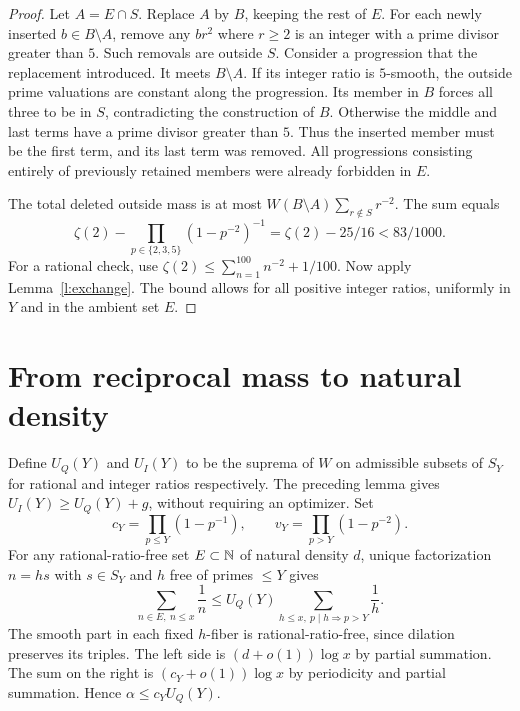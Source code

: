\documentclass[11pt]{article}
\begin{document}
\begin{proof}
Let $A=E\cap S$. Replace $A$ by $B$, keeping the rest of $E$. For each newly inserted $b\in B\setminus A$, remove any $br^2$ where $r\ge2$ is an integer with a prime divisor greater than $5$. Such removals are outside $S$. Consider a progression that the replacement introduced. It meets $B\setminus A$. If its integer ratio is $5$-smooth, the outside prime valuations are constant along the progression. Its member in $B$ forces all three to be in $S$, contradicting the construction of $B$. Otherwise the middle and last terms have a prime divisor greater than $5$. Thus the inserted member must be the first term, and its last term was removed. All progressions consisting entirely of previously retained members were already forbidden in $E$.

The total deleted outside mass is at most $W(B\setminus A)\sum_{r\notin S}r^{-2}$. The sum equals
\[
 \zeta(2)-\prod_{p\in\{2,3,5\}}(1-p^{-2})^{-1}
   =\zeta(2)-25/16 < 83/1000 .
\]
For a rational check, use $\zeta(2)\le\sum_{n=1}^{100}n^{-2}+1/100$. Now apply Lemma~\ref{l:exchange}. The bound allows for all positive integer ratios, uniformly in $Y$ and in the ambient set $E$.
\end{proof}
\section{From reciprocal mass to natural density}
Define $U_Q(Y)$ and $U_I(Y)$ to be the suprema of $W$ on admissible subsets of $S_Y$ for rational and integer ratios respectively. The preceding lemma gives $U_I(Y)\ge U_Q(Y)+g$, without requiring an optimizer. Set
\[
 c_Y=\prod_{p\le Y}(1-p^{-1}),\qquad v_Y=\prod_{p>Y}(1-p^{-2}).
\]
For any rational-ratio-free set $E\subset\mathbb N$ of natural density $d$, unique factorization $n=hs$ with $s\in S_Y$ and $h$ free of primes $\le Y$ gives
\[
 \sum_{n\in E,\ n\le x}\frac1n\le
 U_Q(Y)\sum_{h\le x,\ p\mid h\Rightarrow p>Y}\frac1h.
\]
The smooth part in each fixed $h$-fiber is rational-ratio-free, since dilation preserves its triples. The left side is $(d+o(1))\log x$ by partial summation. The sum on the right is $(c_Y+o(1))\log x$ by periodicity and partial summation. Hence $\alpha\le c_Y U_Q(Y)$.
 
\end{document}
